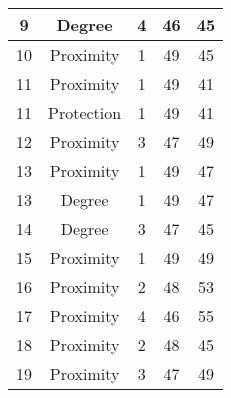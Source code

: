 \documentclass[results.tex]{subfiles}
\begin{document}
\begin{center}
\begin{tabular}{| c || c | c | c | c |}
            \hline
            9                       & Degree                       & 4                      & 46                      & 45                   \\
            \hline
            10                      & Proximity                    & 1                      & 49                      & 45                   \\
            \hline
            11                      & Proximity                    & 1                      & 49                      & 41                   \\
            \hline
            11                      & Protection                   & 1                      & 49                      & 41                   \\
            \hline
            12                      & Proximity                    & 3                      & 47                      & 49                   \\
            \hline
            13                      & Proximity                    & 1                      & 49                      & 47                   \\
            \hline
            13                      & Degree                       & 1                      & 49                      & 47                   \\
            \hline
            14                      & Degree                       & 3                      & 47                      & 45                   \\
            \hline
            15                      & Proximity                    & 1                      & 49                      & 49                   \\
            \hline
            16                      & Proximity                    & 2                      & 48                      & 53                   \\
            \hline
            17                      & Proximity                    & 4                      & 46                      & 55                   \\
            \hline
            18                      & Proximity                    & 2                      & 48                      & 45                   \\
            \hline
            19                      & Proximity                    & 3                      & 47                      & 49                   \\

\end{tabular}
\end{center}
\end{document}
